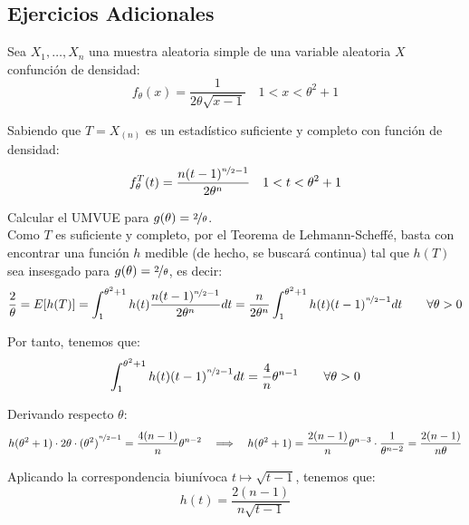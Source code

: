 \subsection*{Ejercicios Adicionales}
\begin{ejercicio}[Reto]
    Sea $X_1, \ldots, X_n$ una muestra aleatoria simple de una variable aleatoria $X$ confunción de densidad:
    \begin{equation*}
        f_\theta(x) = \frac{1}{2\theta\sqrt{x-1}} \quad 1< x < \theta^2 + 1
    \end{equation*}

    Sabiendo que $T=X_{(n)}$ es un estadístico suficiente y completo con función de densidad:
    \begin{equation*}
        f_\theta^T(t) = \frac{n(t-1)^{\nicefrac{n}{2}-1}}{2\theta^n} \quad 1<t<\theta^2+1
    \end{equation*}

    Calcular el UMVUE para $g(\theta)=\nicefrac{2}{\theta}$.\\

    Como $T$ es suficiente y completo, por el Teorema de Lehmann-Scheffé, basta con encontrar una función $h$ medible (de hecho, se buscará continua) tal que $h(T)$ sea insesgado para $g(\theta) = \nicefrac{2}{\theta}$, es decir:
    \begin{equation*}
        \frac{2}{\theta} = E[h(T)] = \int_{1}^{\theta^2+1} h(t) \frac{n(t-1)^{\nicefrac{n}{2}-1}}{2\theta^n} dt = \dfrac{n}{2\theta^n}\int_{1}^{\theta^2+1} h(t) {(t-1)}^{\nicefrac{n}{2}-1} dt\qquad \forall \theta>0
    \end{equation*}

    Por tanto, tenemos que:
    \begin{equation*}
        \int_{1}^{\theta^2+1} h(t) {(t-1)}^{\nicefrac{n}{2}-1} dt = \frac{4}{n}\theta^{n-1}\qquad \forall \theta>0
    \end{equation*}

    Derivando respecto $\theta$:
    \begin{equation*}
        h(\theta^2+1) \cdot 2\theta \cdot {(\theta^2)}^{\nicefrac{n}{2}-1} = \frac{4(n-1)}{n}\theta^{n-2} \quad \Longrightarrow \quad h(\theta^2+1) = \frac{2(n-1)}{n}\theta^{n-3} \cdot \frac{1}{\theta^{n-2}} = \frac{2(n-1)}{n\theta}
    \end{equation*}

    Aplicando la correspondencia biunívoca $t \mapsto \sqrt{t-1}$, tenemos que:
    \begin{equation*}
        h(t) = \frac{2(n-1)}{n\sqrt{t-1}}
    \end{equation*}


\end{ejercicio}
